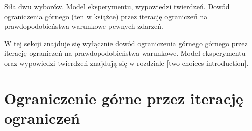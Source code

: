 {
\makeatletter
{}
\makeatother
\graphicspath{{../probabil}}

\begin{questiontext}
	Siła dwu wyborów. Model eksperymentu, wypowiedzi twierdzeń. Dowód ograniczenia górnego (ten w książce) przez iterację ograniczeń na prawdopodobieństwa warunkowe pewnych zdarzeń.
\end{questiontext}

W tej sekcji znajduje się wyłącznie dowód ograniczenia górnego górnego przez iterację ograniczeń na prawdopodobieństwa warunkowe. Model eksperymentu oraz wypowiedzi twierdzeń znajdują się w rozdziale \ref{two-choices-introduction}.

\section{Ograniczenie górne przez iterację ograniczeń}

}